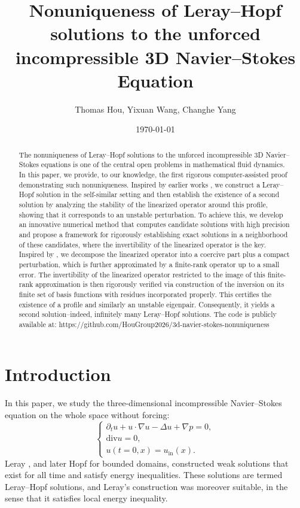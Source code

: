\documentclass[11pt,a4paper]{article}
\title{Nonuniqueness of Leray--Hopf solutions to the unforced incompressible 3D Navier--Stokes
Equation}
\author{Thomas Hou, Yixuan Wang, Changhe Yang}
\date{\today}
\numberwithin{equation}{section}
\newcommand{\tmop}[1]{\ensuremath{\operatorname{#1}}}
\begin{document}
\maketitle
\begin{abstract}
  The nonuniqueness of Leray--Hopf solutions to the unforced incompressible 3D Navier--Stokes equations is one of the central open problems in mathematical fluid dynamics. In this paper, we provide, to our knowledge, the first rigorous computer-assisted proof demonstrating such nonuniqueness. Inspired by earlier works \cite{jia2015incompressible, albritton2022non,guillod2023numerical}, we construct a Leray--Hopf solution in the self-similar setting and then establish the existence of a second solution by analyzing the stability of the linearized operator around this profile, showing that it corresponds to an unstable perturbation. To achieve this, we develop an innovative numerical method that computes candidate solutions with high precision and propose a framework for rigorously establishing exact solutions in a neighborhood of these candidates, {where the invertibility of the linearized operator is the key}. Inspired by \cite{chen2022stable}, we decompose the linearized operator into a coercive part plus a compact perturbation, which is further approximated by a finite-rank operator up to a small error. The invertibility of the linearized operator restricted to the image of this finite-rank approximation is then rigorously verified {via construction of the inversion on its finite set of basis functions with residues incorporated properly}. This certifies the existence of {a profile and similarly an unstable eigenpair}. Consequently, it yields a second solution--indeed, infinitely many Leray--Hopf solutions. The code is publicly available at: https://github.com/HouGroup2026/3d-navier-stokes-nonuniqueness
\end{abstract}
\section{Introduction}
\label{Sec:introd}



In this paper, we study the three-dimensional incompressible Navier--Stokes equation on the whole space without
forcing:
\begin{equation}
  \left\{\begin{array}{l}
    \partial_t u + u \cdot \nabla u - \Delta u + \nabla p = 0,\\
    \mathrm{div} u = 0,\\
    u (t = 0, x) = u_{\tmop{in}} (x) .
  \end{array}\right. \label{eq:NS eq}
\end{equation}
Leray \cite{leray1934}, and later Hopf \cite{hopf1951} for bounded domains, constructed weak solutions that exist for all time and satisfy energy inequalities. These solutions are termed Leray--Hopf solutions, and Leray's construction was moreover suitable, in the sense that it satisfies local energy inequality.
\end{document}
